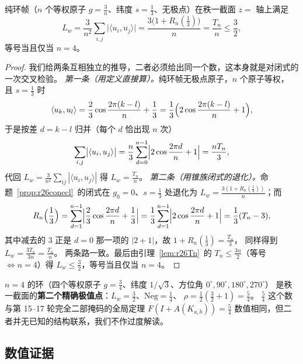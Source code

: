 \begin{proposition}\label{prop:r26ring}
纯环帧（$n$ 个等权原子 $g=\frac3n$、纬度 $s=\frac13$、无极点）在秩一截面 $z=$ 轴上满足
\begin{equation}\label{eq:r26ring}
L_w=\frac{3}{n^2}\sum_{i,j}\bigl|\langle u_i,u_j\rangle\bigr|
=\frac{3\bigl(1+R_n(\frac13)\bigr)}{n}
=\frac{T_n}{n}\le\frac32 ,
\end{equation}
等号当且仅当 $n=4$。
\end{proposition}

\begin{proof}
我们给两条互相独立的推导，二者必须给出同一个数，这本身就是对闭式的一次交叉检验。
\emph{第一条（用定义直接算）。}纯环帧无极点原子，$n$ 个原子等权，
且 $s=\frac13$ 时
\[
\langle u_k,u_l\rangle=\frac23\cos\frac{2\pi(k-l)}n+\frac13
=\frac13\Bigl(2\cos\frac{2\pi(k-l)}n+1\Bigr),
\]
于是按差 $d=k-l$ 归并（每个 $d$ 恰出现 $n$ 次）
\[
\sum_{i,j}\bigl|\langle u_i,u_j\rangle\bigr|
=\frac n3\sum_{d=0}^{n-1}\Bigl|2\cos\frac{2\pi d}n+1\Bigr|=\frac{nT_n}3 ,
\]
代回 $L_w=\frac3{n^2}\sum_{ij}|\langle u_i,u_j\rangle|$ 得 $L_w=\frac{T_n}n$。
\emph{第二条（用锥族闭式的退化）。}命题~\ref{prop:r26conecl}~的闭式在 $g_0=0$、$s=\frac13$ 处退化为
$L_w=\frac{3(1+R_n(\frac13))}n$；而
\[
R_n\Bigl(\frac13\Bigr)=\sum_{d=1}^{n-1}\Bigl|\frac23\cos\frac{2\pi d}n+\frac13\Bigr|
=\frac13\sum_{d=1}^{n-1}\Bigl|2\cos\frac{2\pi d}n+1\Bigr|=\frac13(T_n-3),
\]
其中减去的 $3$ 正是 $d=0$ 那一项的 $|2+1|$，故 $1+R_n(\frac13)=\frac{T_n}3$，
同样得到 $L_w=\frac{3T_n}{3n}=\frac{T_n}n$。
两条路一致。最后由引理~\ref{lem:r26Tn}~的 $T_n\le\frac{3n}2$（等号 $\iff n=4$）得
$L_w\le\frac32$，等号当且仅当 $n=4$。
\end{proof}

\begin{remark}
$n=4$ 的环（四个等权原子 $g=\frac34$、纬度 $1/\sqrt3$、方位角 $0^\circ,90^\circ,180^\circ,270^\circ$）
是秩一截面的\textbf{第二个精确极值点}：$L_w=\frac32$、$\mathrm{Neg}=\frac14$、
$\rho=\frac12(\frac32+1)=\frac54$。
$\frac54$ 这个数与第 15--17 轮完全二部掩码的全局定理 $F(I+A(K_{a,b}))=\frac54$
数值相同，但二者并无已知的结构联系，我们不作过度解读。
\end{remark}

\subsection{数值证据}\label{sec:r26:num}

